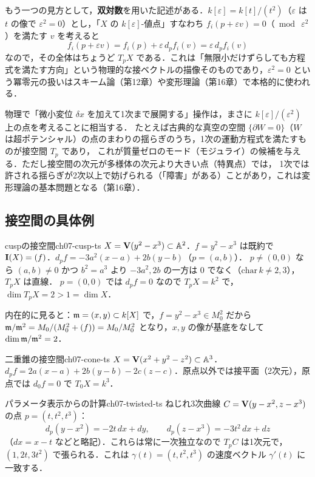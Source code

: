 もう一つの見方として，\textbf{双対数}を用いた記述がある．$k[\varepsilon]=k[t]/(t^2)$（$\varepsilon$ は $t$ の像で $\varepsilon^2=0$）とし，「$X$ の $k[\varepsilon]$-値点」すなわち $f_i(p+\varepsilon v)=0$（$\bmod\ \varepsilon^2$）を満たす $v$ を考えると
\[
  f_i(p+\varepsilon v)=f_i(p)+\varepsilon\,d_pf_i(v)=\varepsilon\,d_pf_i(v)
\]
なので，その全体はちょうど $T_pX$ である．これは「無限小だけずらしても方程式を満たす方向」という物理的な接ベクトルの描像そのものであり，$\varepsilon^2=0$ という冪零元の扱いはスキーム論（第12章）や変形理論（第16章）で本格的に使われる．

\begin{physbox}[無限小変位と線形化]
物理で「微小変位 $\delta x$ を加えて1次まで展開する」操作は，まさに $k[\varepsilon]/(\varepsilon^2)$ 上の点を考えることに相当する．
たとえば古典的な真空の空間 $\{\partial W=0\}$（$W$ は超ポテンシャル）の点のまわりの揺らぎのうち，1次の運動方程式を満たすものが接空間 $T_p$ であり，
これが質量ゼロのモード（モジュライ）の候補を与える．ただし接空間の次元が多様体の次元より大きい点（特異点）では，
1次では許される揺らぎが2次以上で妨げられる（「障害」がある）ことがあり，これは変形理論の基本問題となる（第16章）．
\end{physbox}

\subsection{接空間の具体例}

\begin{myex}{cuspの接空間}{ch07-cusp-ts}
$X=\mathbf{V}(y^2-x^3)\subset\mathbb{A}^2$．$f=y^2-x^3$ は既約で $\mathbf{I}(X)=(f)$．$d_pf=-3a^2(x-a)+2b(y-b)$（$p=(a,b)$）．
$p\neq(0,0)$ なら $(a,b)\neq0$ かつ $b^2=a^3$ より $-3a^2,2b$ の一方は $0$ でなく（$\mathrm{char}\,k\neq2,3$），$T_pX$ は直線．
$p=(0,0)$ では $d_pf=0$ なので $T_pX=k^2$ で，$\dim T_pX=2>1=\dim X$．

内在的に見ると：$\mathfrak{m}=(x,y)\subset k[X]$ で，$f=y^2-x^3\in M_0^2$ だから $\mathfrak{m}/\mathfrak{m}^2=M_0/(M_0^2+(f))=M_0/M_0^2$ となり，$x,y$ の像が基底をなして $\dim\mathfrak{m}/\mathfrak{m}^2=2$．
\end{myex}

\begin{myex}{二重錐の接空間}{ch07-cone-ts}
$X=\mathbf{V}(x^2+y^2-z^2)\subset\mathbb{A}^3$．$d_pf=2a(x-a)+2b(y-b)-2c(z-c)$．原点以外では接平面（2次元），原点では $d_0f=0$ で $T_0X=k^3$．
\end{myex}

\begin{myex}{パラメータ表示からの計算}{ch07-twisted-ts}
ねじれ3次曲線 $C=\mathbf{V}(y-x^2,z-x^3)$ の点 $p=(t,t^2,t^3)$：
\[
  d_p(y-x^2)=-2t\,dx+dy,\qquad d_p(z-x^3)=-3t^2\,dx+dz
\]
（$dx=x-t$ などと略記）．これらは常に一次独立なので $T_pC$ は1次元で，$(1,2t,3t^2)$ で張られる．これは $\gamma(t)=(t,t^2,t^3)$ の速度ベクトル $\gamma'(t)$ に一致する．
\end{myex}

